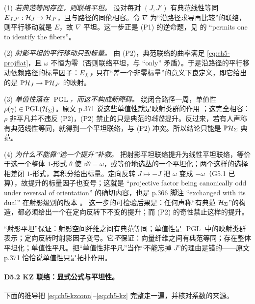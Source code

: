 (1) \emph{若典范等同存在，则联络平坦。} 设对每对 $(J,J')$ 有典范线性等同 $E_{J,J'}:\mathcal{H}_J\to\mathcal{H}_{J'}$，且与路径的同伦相容。令 $\nabla$ 为“沿路径求导再比较”的联络，则平行移动就是 $E$，故 $\nabla$ 平坦。这一步正是 (P1) 的逆命题，见  的 “permits one to identify the fibers”。

(2) \emph{射影平坦的平行移动只到标量。} 由 (P2)，典范联络的曲率满足 \eqref{eq:ch5-projflat}，且 $\omega$ 不恒为零（否则联络平坦，与 “only” 矛盾）。于是沿路径的平行移动依赖路径的标量因子：$E_{J,J'}$ 只在“差一个非零标量”的意义下良定义，即它给出的是 $\mathbb P\mathcal{H}_J\to\mathbb P\mathcal{H}_{J'}$ 的映射。

(3) \emph{单值性落在 $\operatorname{PGL}$，而这不构成新障碍。} 绕闭合路径一周，单值性 $\rho(\gamma)\in\operatorname{PGL}(\mathcal{H}_\Sigma)$。原文 p.371 说这些单值性就是映射类群的作用 ；这完全相容：$\rho$ 非平凡并不违反 (P2)，(P2) 禁止的只是典范的\emph{线性}提升。反过来，若有人声称有典范线性等同，就得到一个平坦联络，与 (P2) 冲突。所以结论只能是 $\mathbb P\mathcal{H}_\Sigma$ 典范。

(4) \emph{为什么不能靠“选一个提升”补救。} 把射影平坦联络提升为线性平坦联络，等价于选一个整体 $1$-形式 $\theta$ 使 $\dd\theta=\omega$，或等价地选丛的一个平坦化；两个这样的选择相差闭 $1$-形式，其积分给出标量。定向反转 $J\mapsto-J$ 把 $\omega$ 变成 $-\omega$（G5.1 已算），故提升的标量因子也变号；这就是 “projective factor being canonically odd under reversal of orientation”  的确切内容，也是 p.366 脚注 “exchanged with its dual” 在射影级别的版本 。\ours{} 这一步的可检验后果是：任何声称“有典范 $\mathcal{H}_\Sigma$”的构造，都必须给出一个在定向反转下不变的提升；而 (P2) 的奇性禁止这样的提升。

\begin{keypoint}
“射影平坦”保证：射影空间纤维之间有典范等同；单值性是 $\operatorname{PGL}$ 中的映射类群表示；定向反转时射影因子变号。它\emph{不}保证：向量纤维之间有典范等同；存在整体平坦化；单值性平凡。把“单值性非平凡”当作“不能忘掉 $J$”的理由是错的——原文 p.371 恰恰说单值性只是拓扑作用。
\end{keypoint}

\paragraph{D5.2 KZ 联络：显式公式与平坦性。}下面的推导把 \eqref{eq:ch5-kzconn}--\eqref{eq:ch5-kz} 完整走一遍，并核对系数的来源。

